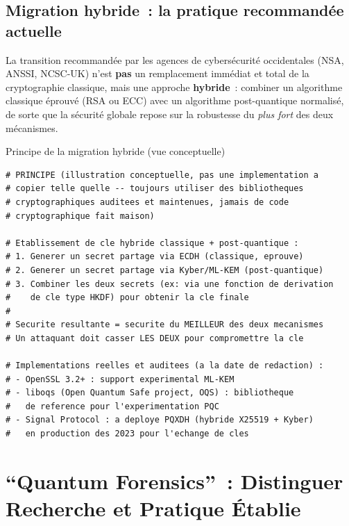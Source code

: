 \subsection{Migration hybride~: la pratique recommandée actuelle}

La transition recommandée par les agences de cybersécurité
occidentales (NSA, ANSSI, NCSC-UK) n'est \textbf{pas} un
remplacement immédiat et total de la cryptographie classique,
mais une approche \textbf{hybride}~: combiner un algorithme
classique éprouvé (RSA ou ECC) avec un algorithme post-quantique
normalisé, de sorte que la sécurité globale repose sur la
robustesse du \emph{plus fort} des deux mécanismes.

\begin{boxoutils}{Principe de la migration hybride (vue conceptuelle)}
\begin{lstlisting}[language=bash_forensique]
# PRINCIPE (illustration conceptuelle, pas une implementation a
# copier telle quelle -- toujours utiliser des bibliotheques
# cryptographiques auditees et maintenues, jamais de code
# cryptographique fait maison)

# Etablissement de cle hybride classique + post-quantique :
# 1. Generer un secret partage via ECDH (classique, eprouve)
# 2. Generer un secret partage via Kyber/ML-KEM (post-quantique)
# 3. Combiner les deux secrets (ex: via une fonction de derivation
#    de cle type HKDF) pour obtenir la cle finale
#
# Securite resultante = securite du MEILLEUR des deux mecanismes
# Un attaquant doit casser LES DEUX pour compromettre la cle

# Implementations reelles et auditees (a la date de redaction) :
# - OpenSSL 3.2+ : support experimental ML-KEM
# - liboqs (Open Quantum Safe project, OQS) : bibliotheque
#   de reference pour l'experimentation PQC
# - Signal Protocol : a deploye PQXDH (hybride X25519 + Kyber)
#   en production des 2023 pour l'echange de cles
\end{lstlisting}
\end{boxoutils}

\section{``Quantum Forensics''~: Distinguer Recherche et Pratique Établie}
\label{sec:quantum-forensics-critique}

